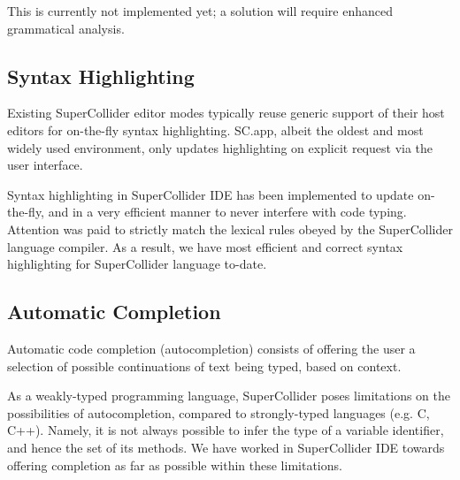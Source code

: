 \documentclass[11pt,a4paper]{article}
\begin{document}
This is currently not implemented yet; a solution will require enhanced grammatical analysis.

\subsection{Syntax Highlighting}
\label{syntax-highlighting}

Existing SuperCollider editor modes typically reuse generic support of their host editors for
on-the-fly syntax highlighting. SC.app, albeit the oldest and most widely used environment, only
updates highlighting on explicit request via the user interface.

Syntax highlighting in SuperCollider IDE has been implemented to update on-the-fly, and in a very
efficient manner to never interfere with code typing. Attention was paid to strictly match the
lexical rules obeyed by the SuperCollider language compiler. As a result, we have most efficient and
correct syntax highlighting for SuperCollider language to-date.

\subsection{Automatic Completion}
\label{auto-completion}

Automatic code completion (autocompletion) consists of offering the user a selection of possible
continuations of text being typed, based on context.

As a weakly-typed programming language, SuperCollider poses limitations on the possibilities of
autocompletion, compared to strongly-typed languages (e.g. C, C++). Namely, it is not always
possible to infer the type of a variable identifier, and hence the set of its methods. We have
worked in SuperCollider IDE towards offering completion as far as possible within these limitations.
\end{document}
